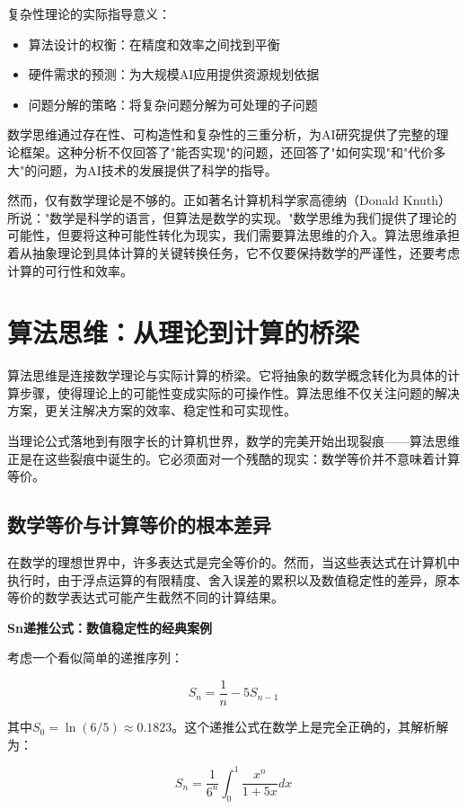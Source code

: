 复杂性理论的实际指导意义：

\begin{itemize}
\item 算法设计的权衡：在精度和效率之间找到平衡
\item 硬件需求的预测：为大规模AI应用提供资源规划依据  
\item 问题分解的策略：将复杂问题分解为可处理的子问题
\end{itemize}

数学思维通过存在性、可构造性和复杂性的三重分析，为AI研究提供了完整的理论框架。这种分析不仅回答了"能否实现"的问题，还回答了"如何实现"和"代价多大"的问题，为AI技术的发展提供了科学的指导。

然而，仅有数学理论是不够的。正如著名计算机科学家高德纳（Donald Knuth）所说："数学是科学的语言，但算法是数学的实现。"数学思维为我们提供了理论的可能性，但要将这种可能性转化为现实，我们需要算法思维的介入。算法思维承担着从抽象理论到具体计算的关键转换任务，它不仅要保持数学的严谨性，还要考虑计算的可行性和效率。

\section{算法思维：从理论到计算的桥梁}

算法思维是连接数学理论与实际计算的桥梁。它将抽象的数学概念转化为具体的计算步骤，使得理论上的可能性变成实际的可操作性。算法思维不仅关注问题的解决方案，更关注解决方案的效率、稳定性和可实现性。

当理论公式落地到有限字长的计算机世界，数学的完美开始出现裂痕——算法思维正是在这些裂痕中诞生的。它必须面对一个残酷的现实：数学等价并不意味着计算等价。

\subsection{数学等价与计算等价的根本差异}

在数学的理想世界中，许多表达式是完全等价的。然而，当这些表达式在计算机中执行时，由于浮点运算的有限精度、舍入误差的累积以及数值稳定性的差异，原本等价的数学表达式可能产生截然不同的计算结果。

\textbf{Sn递推公式：数值稳定性的经典案例}

考虑一个看似简单的递推序列：

$$S_n = \frac{1}{n} - 5S_{n-1}$$

其中$S_0 = \ln(6/5) \approx 0.1823$。这个递推公式在数学上是完全正确的，其解析解为：

$$S_n = \frac{1}{6^n} \int_0^1 \frac{x^n}{1+5x} dx$$

